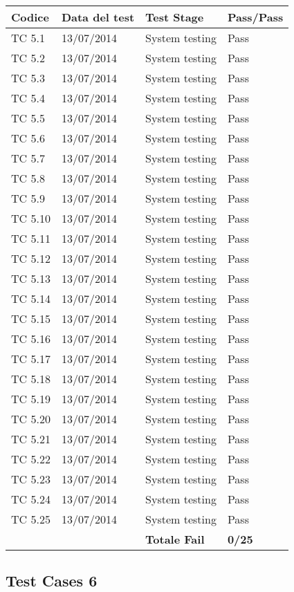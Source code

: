 \begin{tabular}{|p{3cm}|p{3cm}|p{3cm}|p{3cm}|}
	\hline
	\rowcolor{Gray}
	\textbf{Codice} & \textbf{Data del test} & \textbf{Test Stage} & \textbf{Pass/Pass}\tabularnewline
	\hline
	TC 5.1			& 13/07/2014 			& System testing		& Pass \tabularnewline
	\hline
	TC 5.2			& 13/07/2014 			& System testing		& Pass \tabularnewline
	\hline
	TC 5.3			& 13/07/2014 			& System testing		& Pass \tabularnewline
	\hline
	TC 5.4			& 13/07/2014 			& System testing		& Pass \tabularnewline
	\hline
	TC 5.5			& 13/07/2014 			& System testing		& Pass \tabularnewline
	\hline
	TC 5.6			& 13/07/2014 			& System testing		& Pass \tabularnewline
	\hline
	TC 5.7			& 13/07/2014 			& System testing		& Pass \tabularnewline
	\hline
	TC 5.8			& 13/07/2014 			& System testing		& Pass \tabularnewline
	\hline
	TC 5.9			& 13/07/2014 			& System testing		& Pass \tabularnewline
	\hline
	TC 5.10			& 13/07/2014 			& System testing		& Pass \tabularnewline
	\hline
	TC 5.11			& 13/07/2014 			& System testing		& Pass \tabularnewline
	\hline
	TC 5.12			& 13/07/2014 			& System testing		& Pass \tabularnewline
	\hline
	TC 5.13			& 13/07/2014 			& System testing		& Pass \tabularnewline
	\hline
	TC 5.14			& 13/07/2014 			& System testing		& Pass \tabularnewline
	\hline
	TC 5.15			& 13/07/2014 			& System testing		& Pass \tabularnewline
	\hline
	TC 5.16			& 13/07/2014 			& System testing		& Pass \tabularnewline
	\hline
	TC 5.17			& 13/07/2014 			& System testing		& Pass \tabularnewline
	\hline
	TC 5.18			& 13/07/2014 			& System testing		& Pass \tabularnewline
	\hline
	TC 5.19			& 13/07/2014 			& System testing		& Pass \tabularnewline
	\hline
	TC 5.20			& 13/07/2014 			& System testing		& Pass \tabularnewline
	\hline
	TC 5.21			& 13/07/2014 			& System testing		& Pass \tabularnewline
	\hline
	TC 5.22			& 13/07/2014 			& System testing		& Pass \tabularnewline
	\hline
	TC 5.23			& 13/07/2014 			& System testing		& Pass \tabularnewline
	\hline
	TC 5.24			& 13/07/2014 			& System testing		& Pass \tabularnewline
	\hline
	TC 5.25			& 13/07/2014 			& System testing		& Pass \tabularnewline
	\hline
					& 						& \textbf{Totale Fail}	& \textbf{0/25} \tabularnewline
	\hline
\end{tabular}

\subsection{Test Cases 6}

